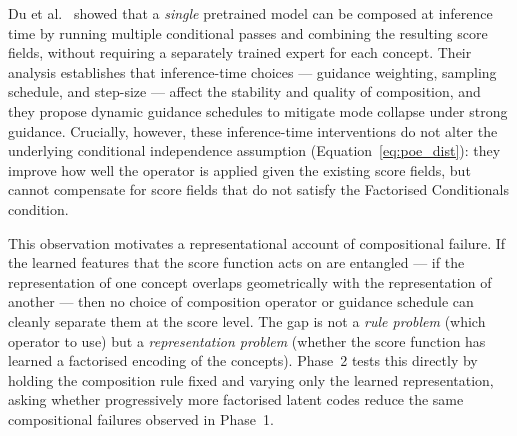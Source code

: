 Du et al.~\citep{du2024compositional} showed that a \emph{single} pretrained model can be
composed at inference time by running multiple conditional passes and combining the resulting
score fields, without requiring a separately trained expert for each concept. Their analysis
establishes that inference-time choices --- guidance weighting, sampling schedule, and
step-size --- affect the stability and quality of composition, and they propose dynamic
guidance schedules to mitigate mode collapse under strong guidance. Crucially, however,
these inference-time interventions do not alter the underlying conditional independence
assumption (Equation~\ref{eq:poe_dist}): they improve how well the operator is applied
given the existing score fields, but cannot compensate for score fields that do not
satisfy the Factorised Conditionals condition.

This observation motivates a representational account of compositional failure. If the
learned features that the score function acts on are entangled --- if the representation of
one concept overlaps geometrically with the representation of another --- then no choice of
composition operator or guidance schedule can cleanly separate them at the score level. The
gap is not a \emph{rule problem} (which operator to use) but a \emph{representation problem}
(whether the score function has learned a factorised encoding of the concepts). Phase~2 tests
this directly by holding the composition rule fixed and varying only the learned
representation, asking whether progressively more factorised latent codes reduce the same
compositional failures observed in Phase~1.
